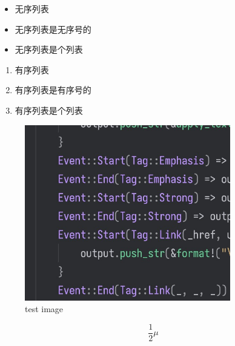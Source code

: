 \begin{itemize}
\item 无序列表
\item 无序列表是无序号的
\item 无序列表是个列表
\end{itemize}
\begin{enumerate}
\item 有序列表
\item 有序列表是有序号的
\item 有序列表是个列表
\end{enumerate}
\begin{figure}[h]
\centering
\includegraphics[width=0.8\textwidth]{images/test.jpg}
\caption{test image}
\label{fig:images/test.jpg}
\end{figure}


\begin{equation}
\label{eq:hhhhh}
\frac{1}{2}\mu
\end{equation}

